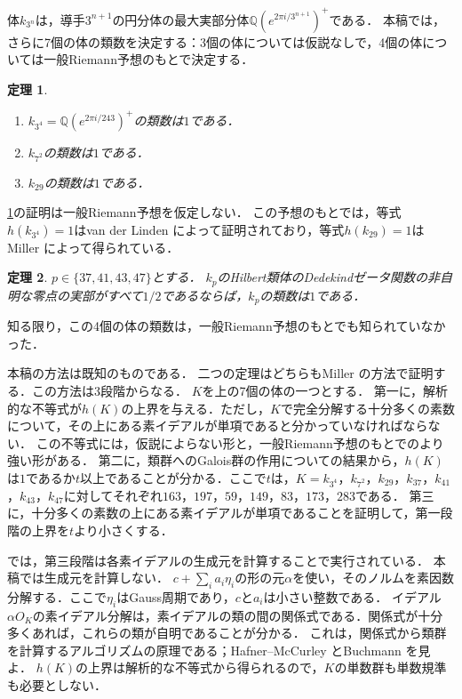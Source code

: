 \documentclass[11pt,a4paper]{ltjsarticle}
\theoremstyle{ja}
\newtheorem{theorem}{定理}[section]
\begin{document}
体$k_{3^n}$は，導手$3^{n+1}$の円分体の最大実部分体$\mathbb{Q}(e^{2\pi i/3^{n+1}})^+$である．
本稿では，さらに7個の体の類数を決定する：3個の体については仮説なしで，4個の体については一般Riemann予想のもとで決定する．

\begin{theorem} \label{thm:main}
\begin{enumerate}
\item $k_{3^4} = \mathbb{Q}(e^{2\pi i/243})^+$の類数は$1$である．
\item $k_{7^2}$の類数は$1$である．
\item $k_{29}$の類数は$1$である．
\end{enumerate}
\end{theorem}

\cref{thm:main}の証明は一般Riemann予想を仮定しない．
この予想のもとでは，等式$h(k_{3^4}) = 1$はvan der Linden \cite[Theorem 2]{vdL82}によって証明されており，等式$h(k_{29}) = 1$はMiller \cite[Table 2]{Mi15b}によって得られている．

\begin{theorem} \label{thm:grh}
$p \in \{37, 41, 43, 47\}$とする．
$k_p$のHilbert類体のDedekindゼータ関数の非自明な零点の実部がすべて$1/2$であるならば，$k_p$の類数は$1$である．
\end{theorem}

知る限り，この4個の体の類数は，一般Riemann予想のもとでも知られていなかった．

本稿の方法は既知のものである．
二つの定理はどちらもMiller \cite{Mi14, Mi15b}の方法で証明する．この方法は3段階からなる．
$K$を上の7個の体の一つとする．
第一に，解析的な不等式が$h(K)$の上界を与える．ただし，$K$で完全分解する十分多くの素数について，その上にある素イデアルが単項であると分かっていなければならない．
この不等式には，仮説によらない形と，一般Riemann予想のもとでのより強い形がある．
第二に，類群へのGalois群の作用についての結果から，$h(K)$は$1$であるか$t$以上であることが分かる．ここで$t$は，$K = k_{3^4}$，$k_{7^2}$，$k_{29}$，$k_{37}$，$k_{41}$，$k_{43}$，$k_{47}$に対してそれぞれ$163$，$197$，$59$，$149$，$83$，$173$，$283$である．
第三に，十分多くの素数の上にある素イデアルが単項であることを証明して，第一段階の上界を$t$より小さくする．

\cite{Mi15b}では，第三段階は各素イデアルの生成元を計算することで実行されている．
本稿では生成元を計算しない．
$c + \sum_i a_i \eta_i$の形の元$\alpha$を使い，そのノルムを素因数分解する．ここで$\eta_i$はGauss周期であり，$c$と$a_i$は小さい整数である．
イデアル$\alpha O_K$の素イデアル分解は，素イデアルの類の間の関係式である．関係式が十分多くあれば，これらの類が自明であることが分かる．
これは，関係式から類群を計算するアルゴリズムの原理である；Hafner--McCurley \cite{HM89}とBuchmann \cite{Bu90}を見よ．
$h(K)$の上界は解析的な不等式から得られるので，$K$の単数群も単数規準も必要としない．
\end{document}
